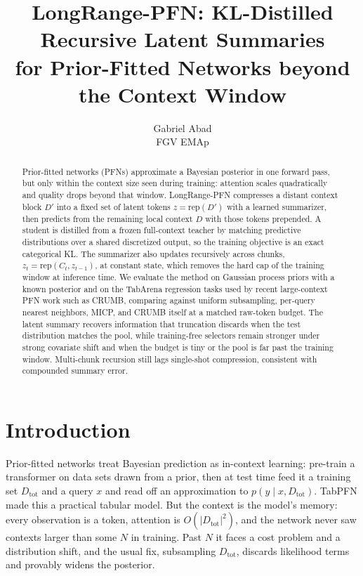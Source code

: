 \documentclass{article}
\title{LongRange-PFN: KL-Distilled Recursive Latent Summaries\\
for Prior-Fitted Networks beyond the Context Window}
\author{%
  Gabriel Abad \\
  FGV EMAp \\
}
\newcommand{\Dtot}{D_{\mathrm{tot}}}
\newcommand{\Dfar}{D'}
\newcommand{\Dloc}{D}
\newcommand{\rep}{\mathrm{rep}}
\begin{document}
\maketitle

\begin{abstract}
Prior-fitted networks (PFNs) approximate a Bayesian posterior in one forward
pass, but only within the context size seen during training: attention scales
quadratically and quality drops beyond that window. LongRange-PFN compresses a
distant context block $\Dfar$ into a fixed set of latent tokens
$z = \rep(\Dfar)$ with a learned summarizer, then predicts from the remaining
local context $\Dloc$ with those tokens prepended. A student is distilled from
a frozen full-context teacher by matching predictive distributions over a
shared discretized output, so the training objective is an exact categorical
KL. The summarizer also updates recursively across chunks,
$z_t = \rep(C_t, z_{t-1})$, at constant state, which removes the hard cap of
the training window at inference time. We evaluate the method on Gaussian
process priors with a known posterior and on the TabArena regression tasks
used by recent large-context PFN work such as CRUMB, comparing against uniform
subsampling, per-query nearest neighbors, MICP, and CRUMB itself at a matched
raw-token budget. The latent summary recovers information that truncation
discards when the test distribution matches the pool, while training-free
selectors remain stronger under strong covariate shift and when the budget is
tiny or the pool is far past the training window. Multi-chunk recursion still
lags single-shot compression, consistent with compounded summary error.
\end{abstract}

\section{Introduction}
\label{sec:intro}

Prior-fitted networks \citep{muller2022pfn} treat Bayesian prediction as
in-context learning: pre-train a transformer on data sets drawn from a prior,
then at test time feed it a training set $\Dtot$ and a query $x$ and read off an
approximation to $p(y \mid x, \Dtot)$. TabPFN
\citep{hollmann2023tabpfn, hollmann2025tabpfn} made this a practical tabular
model. But the context is the model's memory: every observation is a token,
attention is $O(|\Dtot|^2)$, and the network never saw contexts larger than
some $N$ in training. Past $N$ it faces a cost problem and a distribution
shift, and the usual fix, subsampling $\Dtot$, discards likelihood terms and
provably widens the posterior.
\end{document}
